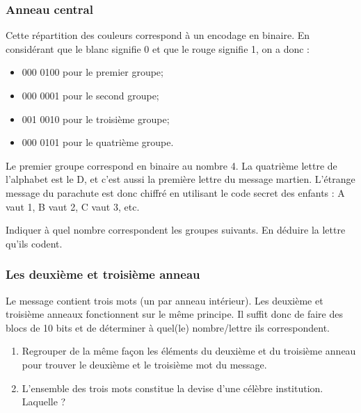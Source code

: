 \documentclass[a4paper,dvipsnames]{article}
\begin{document}
\subsubsection{Anneau central}

 Cette répartition des couleurs correspond à un encodage en binaire. En considérant que le blanc signifie 0 et que le rouge signifie 1, on a donc :

 \begin{itemize}
   \item 000 0100 pour le premier groupe;
   \item 000 0001 pour le second groupe;
   \item 001 0010 pour le troisième groupe;
   \item 000 0101 pour le quatrième groupe.
 \end{itemize}
    
 Le premier groupe correspond en binaire au nombre 4. La quatrième lettre de l'alphabet est le D, et c'est aussi la première lettre du message martien. L'étrange message du parachute est donc chiffré en utilisant le code secret des enfants : A \og{}vaut\fg{} 1, B \og{}vaut\fg{} 2, C \og{}vaut\fg{} 3, etc.

\medskip

\begin{exercice}{}{}
  Indiquer à quel nombre correspondent les groupes suivants. En déduire la lettre qu'ils codent.
\end{exercice}

\subsubsection{Les deuxième et troisième anneau}

Le message contient trois mots (un par anneau intérieur). Les deuxième et troisième anneaux fonctionnent sur le même principe. Il suffit donc de faire des blocs de 10 bits et de déterminer à quel(le) nombre/lettre ils correspondent. 

\medskip

\begin{exercice}{}{}
 \begin{enumerate}
   \item Regrouper de la même façon les éléments du deuxième et du troisième anneau pour trouver le deuxième et le troisième mot du message. 
   \item L'ensemble des trois mots constitue la devise d'une célèbre institution. Laquelle ?
 \end{enumerate} 
\end{exercice}
\end{document}
